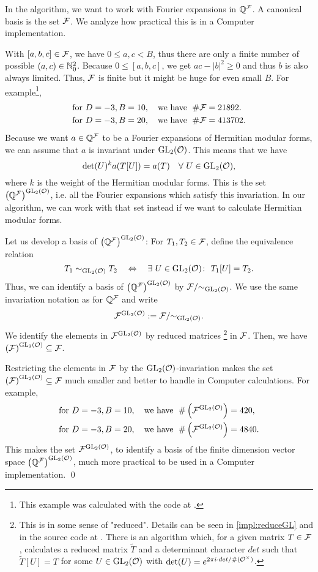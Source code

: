 \begin{remark}
\label{remark:reducedCurlF}
In the algorithm, we want to work with Fourier expansions in $\mathbb{Q}^{\mathcal{F}}$. A canonical basis is the set $\mathcal{F}$. We analyze how practical this is in a Computer implementation.

With $[a,b,c] \in \mathcal{F}$, we have $0\le a,c<B$, thus there are only a finite number of possible $(a,c) \in \mathbb{N}_0^2$. Because $0 \le [a,b,c]$, we get $ac - \left| b \right|^2 \ge 0$ and thus $b$ is also always limited. Thus, $\mathcal{F}$ is finite but it might be huge for even small $B$.
For example\footnote{ This example was calculated with the code at \cite{Zeyer13Github}.},
\begin{align*}
& \text{for } D=-3, B=10,\quad \text{we have } \; \# \mathcal{F} = 21892. \\
& \text{for } D=-3, B=20,\quad \text{we have } \; \# \mathcal{F} = 413702.
\end{align*}
%
Because we want $a \in \mathbb{Q}^{\mathcal{F}}$ to be a Fourier expansions of Hermitian modular forms, we can assume that $a$ is invariant under $\operatorname{GL}_2(\mathcal{O})$. This means that we have
\[ \det(U)^k a(T[U]) = a(T) \quad \forall\ U \in \operatorname{GL}_2(\mathcal{O}) , \]
where $k$ is the weight of the Hermitian modular forms.
This is the set ${\left(\mathbb{Q}^{\mathcal{F}}\right)}^{\operatorname{GL}_2(\mathcal{O})}$, i.e. all the Fourier expansions which satisfy this invariation. In our algorithm, we can work with that set instead if we want to calculate Hermitian modular forms.

Let us develop a basis of ${\left(\mathbb{Q}^{\mathcal{F}}\right)}^{\operatorname{GL}_2(\mathcal{O})}$: For $T_1, T_2 \in \mathcal{F}$, define the equivalence relation
\[ T_1 \sim_{\operatorname{GL}_2(\mathcal{O})} T_2 \quad \Leftrightarrow \quad \exists\ U \in \operatorname{GL}_2(\mathcal{O}) \colon\ T_1[U] = T_2. \]
Thus, we can identify a basis of ${\left(\mathbb{Q}^{\mathcal{F}}\right)}^{\operatorname{GL}_2(\mathcal{O})}$ by $\mathcal{F} / { \sim_{\operatorname{GL}_2(\mathcal{O})} }$.
We use the same invariation notation as for $\mathbb{Q}^{\mathcal{F}}$ and write
\[ {\mathcal{F}}^{\operatorname{GL}_2(\mathcal{O})} := \mathcal{F} / { \sim_{\operatorname{GL}_2(\mathcal{O})} } . \]
We identify the elements in ${\mathcal{F}}^{\operatorname{GL}_2(\mathcal{O})}$ by reduced matrices%
\footnote{
This is in some sense of "reduced". Details can be seen in \cref{impl:reduceGL} and in the source code at \cite{Zeyer13Github}. There is an algorithm which, for a given matrix $T \in \mathcal{F}$, calculates a reduced matrix $\tilde{T}$ and a determinant character $det$ such that $\tilde{T}[U] = T$ for some $U \in \operatorname{GL}_2(\mathcal{O})$ with $\det(U) = e^{2 \pi i \cdot det / {\#(\mathcal{O}^\times)}}$.
}
in $\mathcal{F}$. Then, we have ${\left(\mathcal{F}\right)}^{\operatorname{GL}_2(\mathcal{O})} \subseteq \mathcal{F}$.

Restricting the elements in $\mathcal{F}$ by the $\operatorname{GL}_2(\mathcal{O})$-invariation makes the set ${\left(\mathcal{F}\right)}^{\operatorname{GL}_2(\mathcal{O})} \subseteq \mathcal{F}$ much smaller and better to handle in Computer calculations.
For example,
\begin{align*}
& \text{for } D=-3, B=10,\quad \text{we have } \; \# \left({\mathcal{F}}^{\operatorname{GL}_2(\mathcal{O})}\right) = 420, \\
& \text{for } D=-3, B=20,\quad \text{we have } \; \# \left({\mathcal{F}}^{\operatorname{GL}_2(\mathcal{O})}\right) = 4840.
\end{align*}
%
This makes the set ${\mathcal{F}}^{\operatorname{GL}_2(\mathcal{O})}$, to identify a basis of the finite dimension vector space ${\left(\mathbb{Q}^{\mathcal{F}}\right)}^{\operatorname{GL}_2(\mathcal{O})}$, much more practical to be used in a Computer implementation.
\qed
\end{remark}

